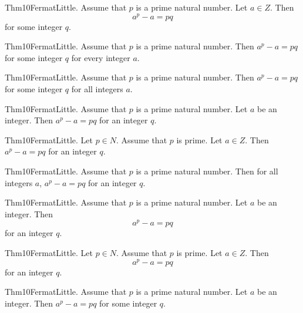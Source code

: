 \documentclass{article}
\begin{document}
Thm10FermatLittle. Assume that $p$ is a prime natural number. Let $a \in Z$. Then $$a ^ {p}- a = p q$$ for some integer $q$.

Thm10FermatLittle. Assume that $p$ is a prime natural number. Then $a ^ {p}- a = p q$ for some integer $q$ for every integer $a$.

Thm10FermatLittle. Assume that $p$ is a prime natural number. Then $a ^ {p}- a = p q$ for some integer $q$ for all integers $a$.

Thm10FermatLittle. Assume that $p$ is a prime natural number. Let $a$ be an integer. Then $a ^ {p}- a = p q$ for an integer $q$.

Thm10FermatLittle. Let $p \in N$. Assume that $p$ is prime. Let $a \in Z$. Then $a ^ {p}- a = p q$ for an integer $q$.

Thm10FermatLittle. Assume that $p$ is a prime natural number. Then for all integers $a$, $a ^ {p}- a = p q$ for an integer $q$.

Thm10FermatLittle. Assume that $p$ is a prime natural number. Let $a$ be an integer. Then $$a ^ {p}- a = p q$$ for an integer $q$.

Thm10FermatLittle. Let $p \in N$. Assume that $p$ is prime. Let $a \in Z$. Then $$a ^ {p}- a = p q$$ for an integer $q$.

Thm10FermatLittle. Assume that $p$ is a prime natural number. Let $a$ be an integer. Then $a ^ {p}- a = p q$ for some integer $q$.
\end{document}
